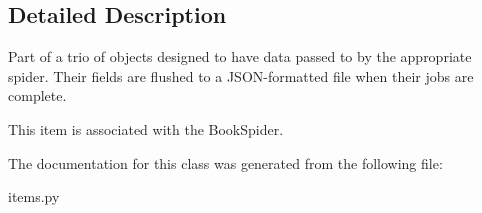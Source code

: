 \subsection{Detailed Description}
\begin{DoxyVerb}Part of a trio of objects designed to have data passed to
by the appropriate spider. Their fields are flushed to
a JSON-formatted file when their jobs are complete.

This item is associated with the BookSpider.
\end{DoxyVerb}
 

The documentation for this class was generated from the following file\+:\begin{DoxyCompactItemize}
\item 
items.\+py\end{DoxyCompactItemize}
